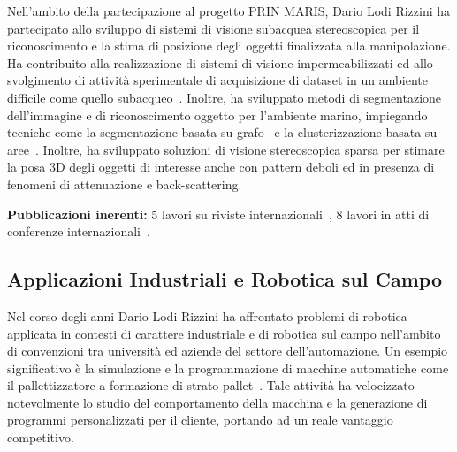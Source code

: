 \documentclass[11pt]{article}
\begin{document}
Nell'ambito della partecipazione al progetto PRIN MARIS,
Dario Lodi Rizzini ha partecipato allo sviluppo di sistemi di visione subacquea stereoscopica 
per il riconoscimento e la stima di posizione degli oggetti finalizzata alla manipolazione. 
Ha contribuito alla realizzazione di sistemi di visione impermeabilizzati ed allo svolgimento
di attivit\`a sperimentale di acquisizione di dataset in un ambiente difficile come quello 
subacqueo~\cite{oleari2014ifac,oleari2015oceans}.
Inoltre, ha sviluppato metodi di segmentazione dell'immagine e di riconoscimento oggetto per l'ambiente marino, 
impiegando tecniche come la segmentazione basata su grafo~\cite{kallasi2015oceans} e 
la clusterizzazione basata su aree~\cite{lodirizzini2015ijars,oleari2014ifac,kallasi2014amra}.
Inoltre, ha sviluppato soluzioni di visione stereoscopica sparsa per stimare la posa 3D 
degli oggetti di interesse anche con pattern deboli ed in presenza di fenomeni di attenuazione 
e back-scattering. 

\textbf{Pubblicazioni inerenti:}
5 lavori su riviste internazionali~\cite{simetti2018joe,lodirizzini2017caee,casalino2016mtsj,lodirizzini2015ijars,aleotti2014jirs},
8 lavori in atti di conferenze internazionali~\cite{chiaravalli2020etfa,aleotti2012icra,oleari2013iccp,
lodirizzini2014ias,aleotti2014iros,kallasi2015oceans,oleari2015oceans,oleari2016iecon}.

\subsection*{Applicazioni Industriali e Robotica sul Campo}

Nel corso degli anni Dario Lodi Rizzini ha affrontato problemi di robotica applicata in contesti 
di carattere industriale e di robotica sul campo nell'ambito di convenzioni tra universit\`a 
ed aziende del settore dell'automazione. 
Un esempio significativo \`e la simulazione e la programmazione di macchine automatiche 
come il pallettizzatore a formazione di strato pallet~\cite{argenti2010isr,calo2012icinco}. 
Tale attivit\`a ha velocizzato notevolmente lo studio del comportamento della macchina e 
la generazione di programmi personalizzati per il cliente, portando ad un reale vantaggio competitivo. 
\end{document}
